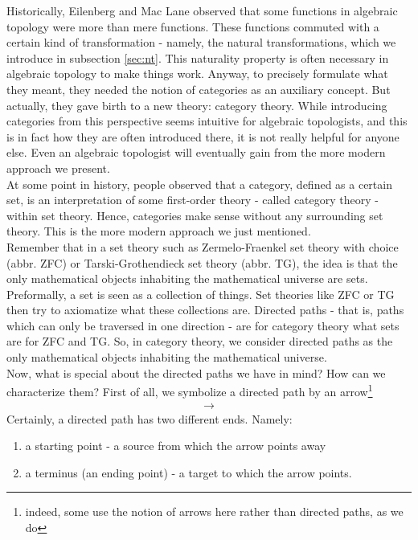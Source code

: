 Historically, Eilenberg and Mac Lane observed that some functions in algebraic topology were more than mere functions.
These functions commuted with a certain kind of transformation - namely, the natural transformations, which we introduce in subsection \ref{sec:nt}.
This naturality property is often necessary in algebraic topology to make things work.
Anyway, to precisely formulate what they meant, they needed the notion of categories as an auxiliary concept.
But actually, they gave birth to a new theory: category theory.
While introducing categories from this perspective seems intuitive for algebraic topologists, and this is in fact how they are often introduced there, it is not really helpful for anyone else.
Even an algebraic topologist will eventually gain from the more modern approach we present.
\\
At some point in history, people observed that a category, defined as a certain set, is an interpretation of some first-order theory - called category theory - within set theory.
Hence, categories make sense without any surrounding set theory.
This is the more modern approach we just mentioned.
\\
Remember that in a set theory such as Zermelo-Fraenkel set theory with choice (abbr. ZFC) or Tarski-Grothendieck set theory (abbr. TG), the idea is that the only mathematical objects inhabiting the mathematical universe are sets.
Preformally, a set is seen as a collection of things.
Set theories like ZFC or TG then try to axiomatize what these collections are.
Directed paths - that is, paths which can only be traversed in one direction - are for category theory what sets are for ZFC and TG.
So, in category theory, we consider directed paths as the only mathematical objects inhabiting the mathematical universe.
\\
Now, what is special about the directed paths we have in mind?
How can we characterize them?
First of all, we symbolize a directed path by an arrow\footnote{indeed, some use the notion of arrows here rather than directed paths, as we do}
\begin{align*}
  \longrightarrow
\end{align*}
Certainly, a directed path has two different ends.
Namely:
\begin{enumerate}
\item[(1)]
a starting point - a source from which the arrow points away
\item[(2)]
a terminus (an ending point) - a target to which the arrow points.
\end{enumerate}
